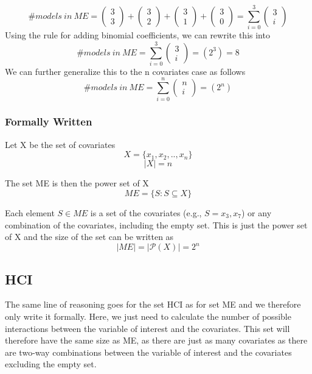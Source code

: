 \[\#models\ in\ ME=\left( \begin{array}{c}
3 \\ 
3 \end{array}
\right)+\left( \begin{array}{c}
3 \\ 
2 \end{array}
\right)+\left( \begin{array}{c}
3 \\ 
1 \end{array}
\right)+\left( \begin{array}{c}
3 \\ 
0 \end{array}
\right)=\sum^3_{i=0}{\left( \begin{array}{c}
3 \\ 
i \end{array}
\right)}\] 
Using the rule for adding binomial coefficients, we can rewrite this into
\[\#models\ in\ ME=\sum^3_{i=0}{\left( \begin{array}{c}
3 \\ 
i \end{array}
\right)}=\left(2^3\right)=8\] 
We can further generalize this to the n covariates case as follows 
\[\#models\ in\ ME=\sum^n_{i=0}{\left( \begin{array}{c}
n \\ 
i \end{array}
\right)}=\left(2^n\right)\] 

\subsubsection{Formally Written} \break 
\noindent Let X be the set of covariates 
\[X=\{\left.x_1,x_2,..,x_n\right.\}\] 
\[\left|X\right|=n\] 


\noindent The set ME is then the power set of X 
\[ME=\{\left.S:S\subseteq X\right.\}\] 

Each element $S\in ME$ is a set of the covariates (e.g., $S=\left.x_3,x_7\right.$) or any combination of the covariates, including the empty set. This is just the power set of X and the size of the set can be written as
\[\left|ME\right|=|\mathcal{P}\left(X\right)|=2^n\] 
\subsection{HCI}

The same line of reasoning goes for the set HCI as for set ME and we therefore only write it formally. Here, we just need to calculate the number of possible interactions between the variable of interest and the covariates. This set will therefore have the same size as ME, as there are just as many covariates as there are two-way combinations between the variable of interest and the covariates excluding the empty set.

